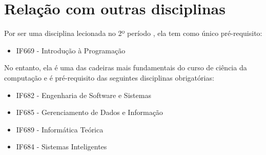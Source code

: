 \documentclass[12pt]{article}
\begin{document}
\section{Relação com outras disciplinas}
Por ser uma disciplina lecionada no 2º período \cite{CInWiki}, ela tem como único pré-requisito:
\begin{itemize}
    \item IF669 - Introdução à Programação
\end{itemize}
No entanto, ela é uma das cadeiras mais fundamentais do curso de ciência da computação e é pré-requisito das seguintes disciplinas obrigatórias:
\begin{itemize}
    \item IF682 - Engenharia de Software e Sistemas
    \item IF685 - Gerenciamento de Dados e Informação
    \item IF689 - Informática Teórica
    \item IF684 - Sistemas Inteligentes
\end{itemize}



\end{document}
